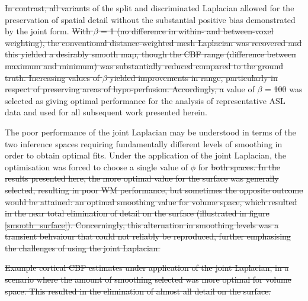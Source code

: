 \documentclass[12pt]{report}
\providecommand{\DIFaddtex}[1]{{\protect\color{blue}\uwave{#1}}} %
\providecommand{\DIFdeltex}[1]{{\protect\color{red}\sout{#1}}}                      %
\providecommand{\DIFaddbegin}{} %
\providecommand{\DIFaddend}{} %
\providecommand{\DIFdelbegin}{} %
\providecommand{\DIFdelend}{} %
\providecommand{\DIFdelFL}[1]{\DIFdel{#1}} %
\providecommand{\DIFadd}[1]{\texorpdfstring{\DIFaddtex{#1}}{#1}} %
\providecommand{\DIFdel}[1]{\texorpdfstring{\DIFdeltex{#1}}{}} %
\newcommand{\DIFscaledelfig}{0.5}
\newlength{\DIFdelgraphicswidth} %
\newlength{\DIFdelgraphicsheight} %
\newcommand{\DIFaddincludegraphics}[2][]{{\color{blue}\fbox{\DIFOincludegraphics[#1]{#2}}}} %
\newcommand{\DIFdelincludegraphics}[2][]{%
\sbox{\DIFdelgraphicsbox}{\DIFOincludegraphics[#1]{#2}}%
\settoboxwidth{\DIFdelgraphicswidth}{\DIFdelgraphicsbox} %
\settoboxtotalheight{\DIFdelgraphicsheight}{\DIFdelgraphicsbox} %
\scalebox{\DIFscaledelfig}{%
\parbox[b]{\DIFdelgraphicswidth}{\usebox{\DIFdelgraphicsbox}\\[-\baselineskip] \rule{\DIFdelgraphicswidth}{0em}}\llap{\resizebox{\DIFdelgraphicswidth}{\DIFdelgraphicsheight}{%
\setlength{\unitlength}{\DIFdelgraphicswidth}%
\begin{picture}(1,1)%
\thicklines\linethickness{2pt} %
{\color[rgb]{1,0,0}\put(0,0){\framebox(1,1){}}}%
{\color[rgb]{1,0,0}\put(0,0){\line( 1,1){1}}}%
{\color[rgb]{1,0,0}\put(0,1){\line(1,-1){1}}}%
\end{picture}%
}\hspace*{3pt}}} %
} %
\DeclareRobustCommand{\DIFaddbegin}{\DIFOaddbegin \let\includegraphics\DIFaddincludegraphics} %
\DeclareRobustCommand{\DIFaddend}{\DIFOaddend \let\includegraphics\DIFOincludegraphics} %
\DeclareRobustCommand{\DIFdelbegin}{\DIFOdelbegin \let\includegraphics\DIFdelincludegraphics} %
\DeclareRobustCommand{\DIFdelend}{\DIFOaddend \let\includegraphics\DIFOincludegraphics} %
\begin{document}
\DIFdelbegin \DIFdel{In contrast, all variants }\DIFdelend \DIFaddbegin \DIFadd{Variants }\DIFaddend of the split and discriminated Laplacian \DIFaddbegin \DIFadd{with $\beta \geq$ 100 }\DIFaddend allowed for the preservation of spatial detail without the substantial positive bias demonstrated by the joint form. \DIFdelbegin \DIFdel{With $\beta$ = 1 (no difference in within- and between-voxel weighting), the conventional distance-weighted mesh Laplacian was recovered and this yielded a desirably smooth map, though the CBF range (difference between maximum and minimum) was substantially reduced compared to the ground truth. Increasing values of $\beta$ yielded improvements in range, particularly in respect of preserving areas of hypo-perfusion. Accordingly, a }\DIFdelend \DIFaddbegin \DIFadd{A }\DIFaddend value of $\beta$ = \DIFdelbegin \DIFdel{100 }\DIFdelend \DIFaddbegin \DIFadd{1000 }\DIFaddend was selected as giving optimal performance for the analysis of representative ASL data and used for all subsequent work presented herein. 

The poor performance of the joint Laplacian may be understood in terms of the two inference spaces requiring fundamentally different levels of smoothing in order to obtain optimal fits. Under the application of the joint Laplacian, the optimisation was forced to choose a single value of $\phi$ for \DIFdelbegin \DIFdel{both spaces. In the results presented here, the more optimal value for the surface was generally selected, resulting in poor WM performance, but sometimes the opposite outcome would be attained: an optimal smoothing value for volume space, which resulted in the near total elimination of detail on the surface (illustrated in figure \ref{smooth_surface}). Concerningly, this alternation in smoothing levels was a transient behvaiour that could not reliably be reproduced, further emphasising the challenges of using the joint Laplacian. 
}%

{%
\DIFdelFL{Example cortical CBF estimates under application of the joint Laplacian, in a scenario where the amount of smoothing selected was more optimal for volume space. This resulted in the elimination of almost all detail on the surface.}}
\end{document}
